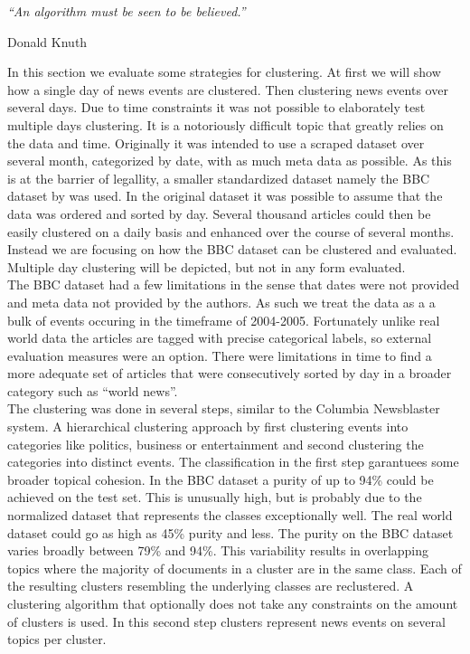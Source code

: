 \epigraph{\emph{
  ``An algorithm must be seen to be believed.''
}}{ Donald Knuth }

In this section we evaluate some strategies for clustering. At first we will show how a single day of news events are clustered. Then clustering news events over several days. Due to time constraints it was not possible to elaborately test multiple days clustering. It is a notoriously difficult topic that greatly relies on the data and time. Originally it was intended to use a scraped dataset over several month, categorized by date, with as much meta data as possible. As this is at the barrier of legallity, a smaller standardized dataset namely the BBC dataset by \cite{BBCData2006} was used. In the original dataset it was possible to assume that the data was ordered and sorted by day. Several thousand articles could then be easily clustered on a daily basis and enhanced over the course of several months. Instead we are focusing on how the BBC dataset can be clustered and evaluated. Multiple day clustering will be depicted, but not in any form evaluated.\\

The BBC dataset had a few limitations in the sense that dates were not provided and meta data not provided by the authors. As such we treat the data as a a bulk of events occuring in the timeframe of 2004-2005. Fortunately unlike real world data the articles are tagged with precise categorical labels, so external evaluation measures were an option. There were limitations in time to find a more adequate set of articles that were consecutively sorted by day in a broader category such as ``world news''.\\

The clustering was done in several steps, similar to the Columbia Newsblaster system.\cite[Columbia stuff]{Nothing} A hierarchical clustering approach by first clustering events into categories like politics, business or entertainment and second clustering the categories into distinct events. The classification in the first step garantuees some broader topical cohesion. In the BBC dataset a purity of up to 94\% could be achieved on the test set. This is unusually high, but is probably due to the normalized dataset that represents the classes exceptionally well. The real world dataset could go as high as 45\% purity and less. \cite[some other evaluation here]{Nothing} The purity on the BBC dataset varies broadly between 79\% and 94\%. This variability results in overlapping topics where the majority of documents in a cluster are in the same class. Each of the resulting clusters resembling the underlying classes are reclustered. A clustering algorithm that optionally does not take any constraints on the amount of clusters is used. In this second step clusters represent news events on several topics per cluster.\\

